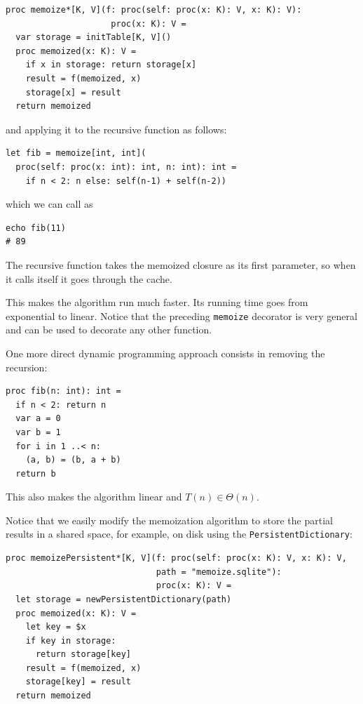 \documentclass[justified, sixbynine]{tufte-book}
\def\ft{\small\tt}
\theoremstyle{plain}%
\newtheorem * {corollary}{Corollary}
\theoremstyle{definition}
\theoremstyle{remark}
\newtheorem * {remark}{Remark}
\newtheorem * {note}{Note}
\begin{document}
\begin{fullwidth}
\begin{lstlisting}[caption={in file: {\ft nlib.nim}}]
proc memoize*[K, V](f: proc(self: proc(x: K): V, x: K): V):
                     proc(x: K): V =
  var storage = initTable[K, V]()
  proc memoized(x: K): V =
    if x in storage: return storage[x]
    result = f(memoized, x)
    storage[x] = result
  return memoized
\end{lstlisting}

and applying it to the recursive function as follows:

\begin{lstlisting}[caption={in file: {\ft nlib.nim}}]
let fib = memoize[int, int](
  proc(self: proc(x: int): int, n: int): int =
    if n < 2: n else: self(n-1) + self(n-2))
\end{lstlisting}

which we can call as

\begin{lstlisting}[caption={in file: {\ft nlib.nim}}]
echo fib(11)
# 89
\end{lstlisting}

The recursive function takes the memoized closure as its first parameter, so when it calls itself it goes through the cache.

This makes the algorithm run much faster. Its running time goes from exponential to linear. Notice that the preceding {\ft memoize} decorator is very general and can be used to decorate any other function.

One more direct
dynamic programming approach consists in removing the recursion:

\begin{lstlisting}
proc fib(n: int): int =
  if n < 2: return n
  var a = 0
  var b = 1
  for i in 1 ..< n:
    (a, b) = (b, a + b)
  return b
\end{lstlisting}

This also makes the algorithm linear and $T(n) \in \Theta(n)$.


Notice that we easily modify the memoization algorithm to store the partial results in a shared space, for example, on disk using the {\ft PersistentDictionary}:

\begin{lstlisting}[caption={in file: {\ft nlib.nim}}]
proc memoizePersistent*[K, V](f: proc(self: proc(x: K): V, x: K): V,
                              path = "memoize.sqlite"):
                              proc(x: K): V =
  let storage = newPersistentDictionary(path)
  proc memoized(x: K): V =
    let key = $x
    if key in storage:
      return storage[key]
    result = f(memoized, x)
    storage[key] = result
  return memoized
\end{lstlisting}


\end{fullwidth}
\end{document}
